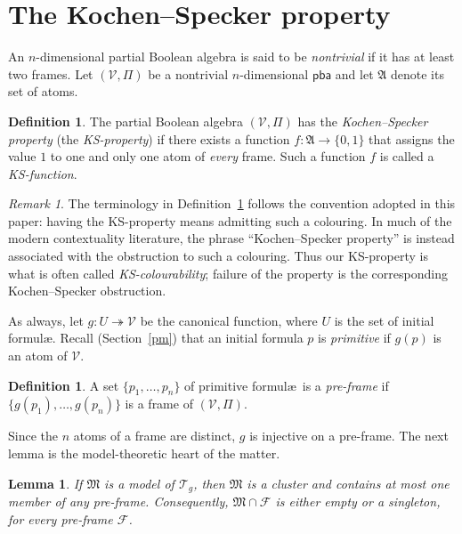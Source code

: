 \documentclass{article}   	%
\theoremstyle{plain}
\newtheorem{lemma}[theorem]{Lemma}
\theoremstyle{definition}
\newtheorem{definition}[theorem]{Definition}
\theoremstyle{remark}
\newtheorem{remark}[theorem]{Remark}
\newcommand{\pba}{\mathsf{pba}}
\begin{document}
\section{The Kochen--Specker property}
\label{ksp}

An $n$-dimensional partial Boolean algebra is said to be \emph{nontrivial} if it
has at least two frames.
Let $(\mathcal V,\Pi)$ be a nontrivial $n$-dimensional $\pba$ and let
$\mathfrak A$ denote its set of atoms.

\begin{definition}
\label{def:ks}
The partial Boolean algebra $(\mathcal V,\Pi)$ has the \emph{Kochen--Specker
property} (the \emph{KS-property}) if there exists a function
$f:\mathfrak A\to\{0,1\}$ that assigns the value $1$ to one and only one atom of
\emph{every} frame.
Such a function $f$ is called a \emph{KS-function}.
\end{definition}

\begin{remark}
The terminology in Definition~\ref{def:ks} follows the convention adopted in
this paper: having the KS-property means admitting such a colouring.  In much of
the modern contextuality literature, the phrase ``Kochen--Specker property'' is
instead associated with the obstruction to such a colouring.  Thus our
KS-property is what is often called \emph{KS-colourability}; failure of the
property is the corresponding Kochen--Specker obstruction.
\end{remark}

As always, let $g:U\twoheadrightarrow\mathcal V$ be the canonical function, where
$U$ is the set of initial formul\ae.
Recall (Section~\ref{pm}) that an initial formula $p$ is \emph{primitive} if
$g(p)$ is an atom of $\mathcal V$.

\begin{definition}
\label{def:preframe}
A set $\{p_1,\dots,p_n\}$ of primitive formul\ae\ is a \emph{pre-frame} if
$\{g(p_1),\dots,g(p_n)\}$ is a frame of $(\mathcal V,\Pi)$.
\end{definition}

Since the $n$ atoms of a frame are distinct, $g$ is injective on a pre-frame.
The next lemma is the model-theoretic heart of the matter.

\begin{lemma}
\label{lem:preKS}
If $\mathfrak M$ is a model of $\mathcal T_g$, then $\mathfrak M$ is a cluster and
contains at most one member of any pre-frame.
Consequently, $\mathfrak M\cap\mathcal F$ is either empty or a singleton, for
every pre-frame $\mathcal F$.
\end{lemma}
\end{document}
